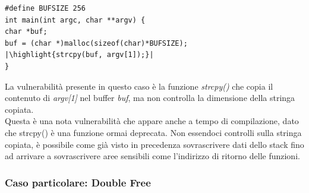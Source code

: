\begin{verbatim}
#define BUFSIZE 256
int main(int argc, char **argv) {
char *buf;
buf = (char *)malloc(sizeof(char)*BUFSIZE);
|\highlight{strcpy(buf, argv[1]);}|
}
\end{verbatim}

La vulnerabilità presente in questo \cite{MitreHeap} caso è la funzione \textit{strcpy()} che copia il contenuto di \textit{argv[1]} nel buffer \textit{buf}, ma non controlla la dimensione della stringa copiata. \\
Questa è una nota vulnerabilità che appare anche a tempo di compilazione, dato che strcpy() è una funzione ormai deprecata. Non essendoci controlli sulla stringa copiata, è possibile come già visto in precedenza sovrascrivere dati dello stack fino ad arrivare a sovrascrivere aree sensibili come l'indirizzo di ritorno delle funzioni. \\
\newline

\subsubsection*{Caso particolare: Double Free}

